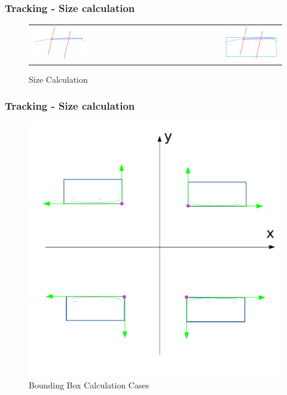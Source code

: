 \documentclass[nosymbols]{beamer}	%
\begin{document}
\begin{frame}
\frametitle{Tracking - Size calculation}
\begin{figure}[!ht]
\caption{Size Calculation}
\begin{tabular}{ l r }
 \includegraphics[width=0.45\textwidth,height=0.7\textheight,keepaspectratio]{bilder/obst_devide_angle_rot.png} &
 \includegraphics[width=0.45\textwidth,height=0.7\textheight,keepaspectratio]{bilder/obst_devide_angle_size.png}
\end{tabular}
\label{segments}
\end{figure}
\end{frame}

\begin{frame}
\frametitle{Tracking - Size calculation}
\begin{figure}[!ht]
\begin{center}
\caption{Bounding Box Calculation Cases}
\includegraphics[width=\textwidth,height=0.7\textheight,keepaspectratio]{bilder/cases.pdf}
\end{center}
\end{figure}
\end{frame}
\end{document}
